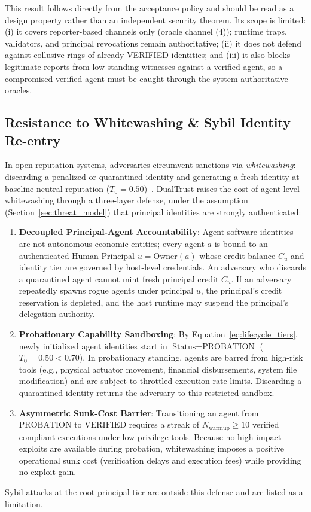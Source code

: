 \documentclass[manuscript, screen, review]{jair}
\begin{document}
This result follows directly from the acceptance policy and should be read as a design property rather than an independent security theorem. Its scope is limited: (i) it covers reporter-based channels only (oracle channel (4)); runtime traps, validators, and principal revocations remain authoritative; (ii) it does not defend against collusive rings of already-VERIFIED identities; and (iii) it also blocks legitimate reports from low-standing witnesses against a verified agent, so a compromised verified agent must be caught through the system-authoritative oracles.

\subsection{Resistance to Whitewashing \& Sybil Identity Re-entry}
\label{sec:whitewashing}
In open reputation systems, adversaries circumvent sanctions via \emph{whitewashing}: discarding a penalized or quarantined identity and generating a fresh identity at baseline neutral reputation ($T_0 = 0.50$)~\cite{douceur2002sybil}. DualTrust raises the cost of agent-level whitewashing through a three-layer defense, under the assumption (Section~\ref{sec:threat_model}) that principal identities are strongly authenticated:
\begin{enumerate}[leftmargin=12pt, topsep=2pt, itemsep=1pt]
\item \textbf{Decoupled Principal-Agent Accountability}: Agent software identities are not autonomous economic entities; every agent $a$ is bound to an authenticated Human Principal $u = \text{Owner}(a)$ whose credit balance $C_u$ and identity tier are governed by host-level credentials. An adversary who discards a quarantined agent cannot mint fresh principal credit $C_u$. If an adversary repeatedly spawns rogue agents under principal $u$, the principal's credit reservation is depleted, and the host runtime may suspend the principal's delegation authority.
\item \textbf{Probationary Capability Sandboxing}: By Equation~\eqref{eq:lifecycle_tiers}, newly initialized agent identities start in $\text{Status} = \text{PROBATION}$ ($T_0 = 0.50 < 0.70$). In probationary standing, agents are barred from high-risk tools (e.g., physical actuator movement, financial disbursements, system file modification) and are subject to throttled execution rate limits. Discarding a quarantined identity returns the adversary to this restricted sandbox.
\item \textbf{Asymmetric Sunk-Cost Barrier}: Transitioning an agent from $\text{PROBATION}$ to $\text{VERIFIED}$ requires a streak of $N_{\text{warmup}} \ge 10$ verified compliant executions under low-privilege tools. Because no high-impact exploits are available during probation, whitewashing imposes a positive operational sunk cost (verification delays and execution fees) while providing no exploit gain.
\end{enumerate}
Sybil attacks at the root principal tier are outside this defense and are listed as a limitation.
\end{document}
